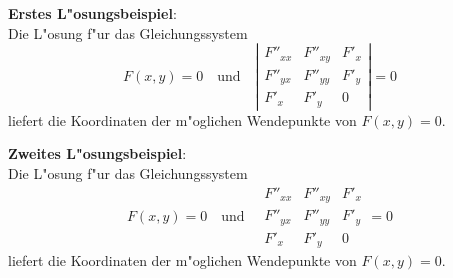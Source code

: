 \documentclass{article}
\begin{document}
\noindent\textbf{Erstes L"osungsbeispiel}:\\[1ex]
Die L"osung f"ur das Gleichungssystem
\[ \renewcommand{\arraystretch}{1.2}
   F(x,y) = 0\quad\mbox{und}\quad
   \left|\begin{array}{ccc}
     F''_{xx} & F''_{xy} & F'_x\\
     F''_{yx} & F''_{yy} & F'_y\\
     F'_x     & F'_y     & 0
   \end{array}\right| = 0     
\]
liefert die Koordinaten der m"oglichen Wendepunkte von $F(x,y) = 0$.

\bigskip
\noindent\textbf{Zweites L"osungsbeispiel}:\\[1ex]
Die L"osung f"ur das Gleichungssystem
\[ \renewcommand{\arraystretch}{1.2}
   F(x,y) = 0\quad\mbox{und}\quad\begin{array}{|ccc|}
   F''_{xx} & F''_{xy} & F'_x\\
   F''_{yx} & F''_{yy} & F'_y\\
   F'_x     & F'_y     & 0
  \end{array} = 0     
\]
liefert die Koordinaten der m"oglichen Wendepunkte von $F(x,y) = 0$.
\end{document}
